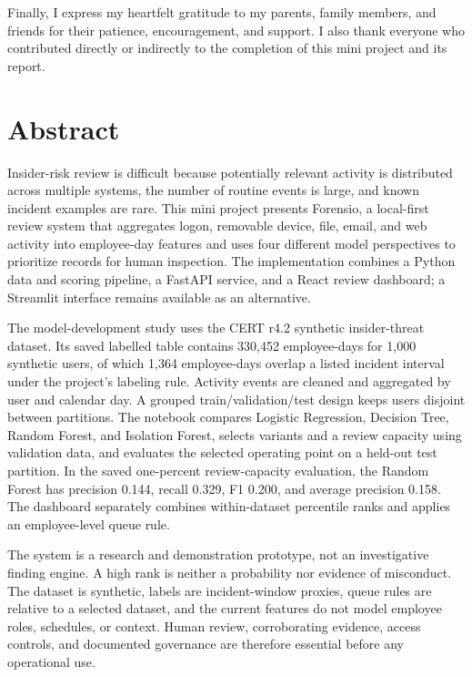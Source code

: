 Finally, I express my heartfelt gratitude to my parents, family
members, and friends for their patience, encouragement, and support. I
also thank everyone who contributed directly or indirectly to the
completion of this mini project and its report.

\chapter*{Abstract}
Insider-risk review is difficult because potentially relevant activity
is distributed across multiple systems, the number of routine events is
large, and known incident examples are rare. This mini project presents
Forensio, a local-first review system that aggregates logon, removable
device, file, email, and web activity into employee-day features and
uses four different model perspectives to prioritize records for human
inspection. The implementation combines a Python data and scoring
pipeline, a FastAPI service, and a React review dashboard; a Streamlit
interface remains available as an alternative.

The model-development study uses the CERT r4.2 synthetic insider-threat
dataset. Its saved labelled table contains 330,452 employee-days for
1,000 synthetic users, of which 1,364 employee-days overlap a listed
incident interval under the project's labeling rule. Activity events
are cleaned and aggregated by user and calendar day. A grouped
train/validation/test design keeps users disjoint between partitions.
The notebook compares Logistic Regression, Decision Tree, Random
Forest, and Isolation Forest, selects variants and a review capacity
using validation data, and evaluates the selected operating point on a
held-out test partition. In the saved one-percent review-capacity
evaluation, the Random Forest has precision 0.144, recall 0.329, F1
0.200, and average precision 0.158. The dashboard separately combines
within-dataset percentile ranks and applies an employee-level queue
rule.

The system is a research and demonstration prototype, not an
investigative finding engine. A high rank is neither a probability nor
evidence of misconduct. The dataset is synthetic, labels are
incident-window proxies, queue rules are relative to a selected
dataset, and the current features do not model employee roles,
schedules, or context. Human review, corroborating evidence, access
controls, and documented governance are therefore essential before any
operational use.

